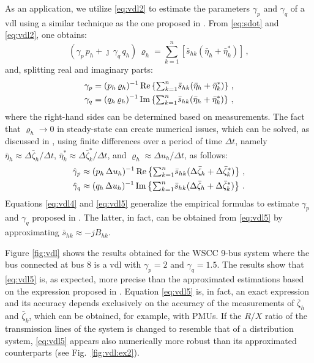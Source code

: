 \documentclass[journal, twocolumn, letter]{IEEEtran}
\renewcommand{\Re}{{\rm Re}}
\renewcommand{\Im}{{\rm Im}}
\newcommand{\Bhk}{B_{hk}}
\newcommand{\etah}{\bar{\eta}_h}
\newcommand{\etak}{\bar{\eta}_k}
\newcommand{\uh}{u_h}
\newcommand{\rhoh}{\varrho_h}
\newcommand{\eh}{\bar{\zeta}_h}
\newcommand{\ek}{\bar{\zeta}_k}
\newcommand{\ph}{p_h}
\newcommand{\qh}{q_h}
\newcommand{\shk}{\bar{s}_{hk}}
\newcommand{\sk}{{\textstyle \sum}_{k=1}^{n}}
\newcommand{\jj}{\jmath}
\begin{document}
As an application, we utilize \eqref{eq:vdl2} to estimate the
parameters $\gamma_p$ and $\gamma_q$ of a \ac{vdl} using a similar
technique as the one proposed in \cite{Freqload}.  From
\eqref{eq:sdot} and \eqref{eq:vdl2}, one obtains:
\begin{equation}
  \label{eq:vdl3}
  (\gamma_p \, \ph + \jj \, \gamma_q \, \qh ) \, \rhoh =
  \sk [\shk (\etah + \etak^*)] \, ,
\end{equation}
and, splitting real and imaginary parts:
\begin{equation}
  \label{eq:vdl4}
  \begin{aligned}
    \gamma_p &= (\ph \, \rhoh)^{-1} \, \Re \left \{ \sk \shk (\etah + \etak^*) \right \} \, , \\
    \gamma_q &= (\qh \, \rhoh)^{-1} \, \Im \left \{ \sk \shk (\etah + \etak^*) \right \} \, , \\
  \end{aligned}
\end{equation}
where the right-hand sides can be determined based on measurements.
The fact that $\rhoh \rightarrow 0$ in steady-state can create
numerical issues, which can be solved, as discussed in
\cite{Freqload}, using finite differences over a period of time
$\Delta t$, namely $\etah \approx \Delta \eh/\Delta t$,
$\etak^* \approx \Delta \ek^*/\Delta t$, and
$\rhoh \approx \Delta \uh/\Delta t$, as follows:
\begin{equation}
  \label{eq:vdl5}
  \begin{aligned}
    \hat{\gamma}_p &\approx (\ph \, \Delta \uh)^{-1} \,
    \Re \left \{ \sk \shk (\Delta \eh + \Delta \ek^*) \right \} \, , \\
    \hat{\gamma}_q &\approx (\qh \, \Delta \uh)^{-1} \, \Im \left \{ \sk \shk
      (\Delta \eh + \Delta \ek^*) \right \} \, .
  \end{aligned}
\end{equation}
Equations \eqref{eq:vdl4} and \eqref{eq:vdl5} generalize the empirical
formulas to estimate $\gamma_p$ and $\gamma_q$ proposed in
\cite{Freqload}.  The latter, in fact, can be obtained from
\eqref{eq:vdl5} by approximating $\shk \approx - j \Bhk$.

Figure \ref{fig:vdl} shows the results obtained for the WSCC 9-bus
system where the bus connected at bus 8 is a \ac{vdl} with
$\gamma_p = 2$ and $\gamma_q = 1.5$.  The results show that
\eqref{eq:vdl5} is, as expected, more precise than the approximated
estimations based on the expression proposed in \cite{Freqload}.
Equation \eqref{eq:vdl5} is, in fact, an exact expression and its
accuracy depends exclusively on the accuracy of the measurements of
$\eh$ and $\ek$, which can be obtained, for example, with PMUs.  If
the $R/X$ ratio of the transmission lines of the system is changed to
resemble that of a distribution system, \eqref{eq:vdl5} appears also
numerically more robust than its approximated counterparts (see
Fig.~\ref{fig:vdl:ex2}).
\end{document}
